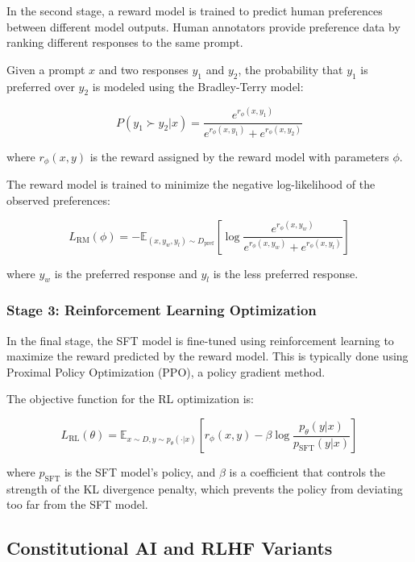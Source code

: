 \documentclass{article}
\begin{document}
In the second stage, a reward model is trained to predict human preferences between different model outputs. Human annotators provide preference data by ranking different responses to the same prompt.

Given a prompt $x$ and two responses $y_1$ and $y_2$, the probability that $y_1$ is preferred over $y_2$ is modeled using the Bradley-Terry model:

\begin{equation}
P(y_1 \succ y_2 | x) = \frac{e^{r_\phi(x, y_1)}}{e^{r_\phi(x, y_1)} + e^{r_\phi(x, y_2)}}
\end{equation}

where $r_\phi(x, y)$ is the reward assigned by the reward model with parameters $\phi$.

The reward model is trained to minimize the negative log-likelihood of the observed preferences:

\begin{equation}
L_{\text{RM}}(\phi) = -\mathbb{E}_{(x, y_w, y_l) \sim D_{\text{pref}}}\left[\log \frac{e^{r_\phi(x, y_w)}}{e^{r_\phi(x, y_w)} + e^{r_\phi(x, y_l)}}\right]
\end{equation}

where $y_w$ is the preferred response and $y_l$ is the less preferred response.

\subsubsection{Stage 3: Reinforcement Learning Optimization}

In the final stage, the SFT model is fine-tuned using reinforcement learning to maximize the reward predicted by the reward model. This is typically done using Proximal Policy Optimization (PPO), a policy gradient method.

The objective function for the RL optimization is:

\begin{equation}
L_{\text{RL}}(\theta) = \mathbb{E}_{x \sim D, y \sim p_{\theta}(\cdot|x)}\left[r_\phi(x, y) - \beta \log\frac{p_{\theta}(y|x)}{p_{\text{SFT}}(y|x)}\right]
\end{equation}

where $p_{\text{SFT}}$ is the SFT model's policy, and $\beta$ is a coefficient that controls the strength of the KL divergence penalty, which prevents the policy from deviating too far from the SFT model.

\subsection{Constitutional AI and RLHF Variants}
\end{document}
